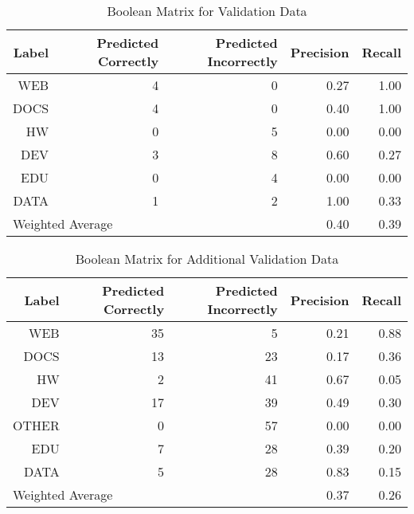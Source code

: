 \begin{table}[h]
\centering
\caption{Boolean Matrix for Validation Data}
\label{boolean_matrix_small_source_code_validation}
\begin{tabular}{|r|r|r|r|r|}
 \hline
Label & Predicted Correctly & Predicted Incorrectly & Precision & Recall \\ \hline
WEB & 4 & 0 & 0.27 & 1.00 \\ \hline
DOCS & 4 & 0 & 0.40 & 1.00 \\ \hline
HW & 0 & 5 & 0.00 & 0.00 \\ \hline
DEV & 3 & 8 & 0.60 & 0.27 \\ \hline
EDU & 0 & 4 & 0.00 & 0.00 \\ \hline
DATA & 1 & 2 & 1.00 & 0.33 \\ \hline
\multicolumn{3}{|l|}{Weighted Average} & 0.40 & 0.39 \\ \hline
\end{tabular}
\end{table}

\begin{table}[h]
\centering
\caption{Boolean Matrix for Additional Validation Data}
\label{boolean_matrix_small_source_code_add_validation}
\begin{tabular}{|r|r|r|r|r|}
 \hline
Label & Predicted Correctly & Predicted Incorrectly & Precision & Recall \\ \hline
WEB & 35 & 5 & 0.21 & 0.88 \\ \hline
DOCS & 13 & 23 & 0.17 & 0.36 \\ \hline
HW & 2 & 41 & 0.67 & 0.05 \\ \hline
DEV & 17 & 39 & 0.49 & 0.30 \\ \hline
OTHER & 0 & 57 & 0.00 & 0.00 \\ \hline
EDU & 7 & 28 & 0.39 & 0.20 \\ \hline
DATA & 5 & 28 & 0.83 & 0.15 \\ \hline
\multicolumn{3}{|l|}{Weighted Average} & 0.37 & 0.26 \\ \hline
\end{tabular}
\end{table}